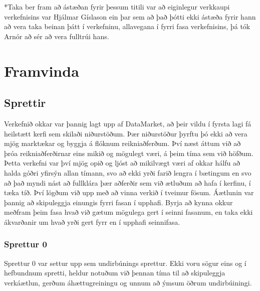 \documentclass{article}
\begin{document}
*Taka ber fram að ástæðan fyrir þessum titili var að eiginlegur verkkaupi verkefnisins var Hjálmar Gíslason ein þar sem að það þótti ekki ástæða fyrir hann að vera taka beinan þátt í verkefninu, allavegana í fyrri fasa verkefnisins, þá tók Arnór að sér að vera fulltrúi hans.

\section{Framvinda}
\subsection{Sprettir}
Verkefnið okkar var þannig lagt upp af DataMarket, að þeir vildu í fyrsta lagi fá heilstætt kerfi sem skilaði niðurstöðum. 
Þær niðurstöður þyrftu þó ekki að vera mjög marktækar og byggja á flóknum reikniaðferðum. Því næst áttum við að þróa reikniaðferðirnar eins 
mikið og mögulegt væri, á þeim tíma sem við höfðum. Þetta verkefni var því mjög opið og ljóst að mikilvægt væri 
af okkar hálfu að halda góðri yfirsýn allan tímann, svo að ekki yrði farið lengra í bætingum en svo að það myndi nást að fullklára þær 
aðferðir sem við ætluðum að hafa í kerfinu, í tæka tíð. Því lögðum við upp með að vinna verkið í tveimur fösum. Áætlunin var þannig að skipuleggja
einungis fyrri fasan í upphafi. Byrja að kynna okkur meðfram þeim fasa hvað við gætum mögulega gert í seinni fasanum, en taka ekki ákvarðanir 
um hvað yrði gert fyrr en í upphafi seinnifasa.

\subsubsection{Sprettur 0}
Sprettur 0 var settur upp sem undirbúnings sprettur. Ekki voru sögur eins og í
hefbundnum spretti, heldur notuðum við þennan tíma til að 
skipuleggja verkáætlun, gerðum áhættugreiningu og unnum að ýmsum öðrum
undirbúiningi.
\end{document}
